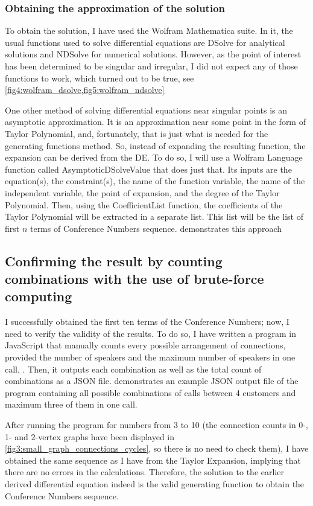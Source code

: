 \documentclass[stu, 11pt, a4paper, floatsintext]{apa7}
\begin{document}
	\subsubsection{Obtaining the approximation of the solution}
	To obtain the solution, I have used the Wolfram Mathematica suite. In it, the usual functions used to solve differential equations are DSolve for analytical solutions and NDSolve for numerical solutions. However, as the point of interest has been determined to be singular and irregular, I did not expect any of those functions to work, which turned out to be true, see \cref{fig4:wolfram_dsolve,fig5:wolfram_ndsolve}
	
	One other method of solving differential equations near singular points is an asymptotic approximation. It is an approximation near some point in the form of Taylor Polynomial, and, fortunately, that is just what is needed for the generating functions method. So, instead of expanding the resulting function, the expansion can be derived from the DE. To do so, I will use a Wolfram Language function called AsymptoticDSolveValue that does just that. Its inputs are the equation(s), the constraint(s), the name of the function variable, the name of the independent variable, the point of expansion, and the degree of the Taylor Polynomial. Then, using the CoefficientList function, the coefficients of the Taylor Polynomial will be extracted in a separate list. This list will be the list of first $n$ terms of Conference Numbers sequence.  demonstrates this approach
	\subsection{Confirming the result by counting combinations with the use of brute-force computing}
	I successfully obtained the first ten terms of the Conference Numbers; now, I need to verify the validity of the results. To do so, I have written a program in JavaScript that manually counts every possible arrangement of connections, provided the number of speakers and the maximum number of speakers in one call, \Parencite{mykhaylov_mmykhaylovtelephonenumbers_2020}. Then, it outputs each combination as well as the total count of combinations as a JSON file.  demonstrates an example JSON output file of the program containing all possible combinations of calls between 4 customers and maximum three of them in one call.
	
	After running the program for numbers from 3 to 10 (the connection counts in 0-, 1- and 2-vertex graphs have been displayed in \cref{fig3:small_graph_connections_cycles}, so there is no need to check them), I have obtained the same sequence as I have from the Taylor Expansion, implying that there are no errors in the calculations. Therefore, the solution to the earlier derived differential equation indeed is the valid generating function to obtain the Conference Numbers sequence.
\end{document}
